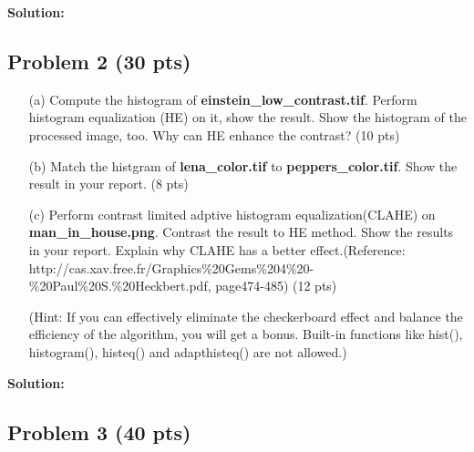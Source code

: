 \documentclass[11pt,letterpaper]{article}
\begin{document}
\textbf{Solution:}

\clearpage

\subsection*{Problem 2 (30 pts)}
\begin{itemize}
\item[(a)] Compute the histogram of \textbf{einstein\_low\_contrast.tif}. Perform histogram equalization (HE) on it, show the result. Show the histogram of the processed image, too. Why can HE enhance the contrast? (10 pts)

\item[(b)] Match the histgram of \textbf{lena\_color.tif} to \textbf{peppers\_color.tif}. Show the result in your report. (8 pts)

\item[(c)] Perform contrast limited adptive histogram equalization(CLAHE) on \textbf{man\_in\_house.png}. Contrast the result to HE method. Show the results in your report. Explain why CLAHE has a better effect.(Reference: http://cas.xav.free.fr/Graphics\%20Gems\%204\%20-\%20Paul\%20S.\%20Heckbert.pdf, 
 page474-485) (12 pts)

(\textcolor[rgb]{1,0,0}{Hint:} If you can effectively eliminate the checkerboard effect and balance the efficiency of the algorithm, you will get a bonus. Built-in functions like hist(), histogram(), histeq() and adapthisteq() are not allowed.)
\end{itemize}

\textbf{Solution:}
\clearpage

\subsection*{Problem 3 (40 pts)}
\end{document}
